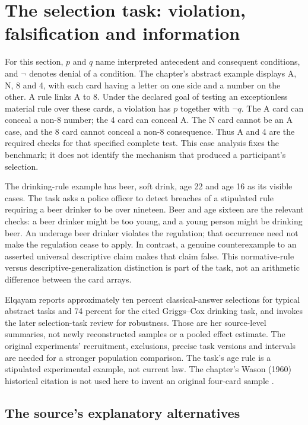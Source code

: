 \section{The selection task: violation, falsification and information}
\label{sec:p19-r112-selection}

For this section, \(p\) and \(q\) name interpreted antecedent and consequent
conditions, and \(\neg\) denotes denial of a condition. The chapter's abstract
example displays A, N, 8 and 4, with each card having a letter on one side and
a number on the other. A rule links A to 8. Under the declared goal of testing
an exceptionless material rule over these cards, a violation has \(p\) together
with \(\neg q\). The A card can conceal a non-8 number; the 4 card can conceal
A. The N card cannot be an A case, and the 8 card cannot conceal a non-8
consequence. Thus A and 4 are the required checks for that specified complete
test. This case analysis fixes the benchmark; it does not identify the
mechanism that produced a participant's selection.

The drinking-rule example has beer, soft drink, age 22 and age 16 as its visible
cases. The task asks a police officer to detect breaches of a stipulated rule
requiring a beer drinker to be over nineteen. Beer and age sixteen are the
relevant checks: a beer drinker might be too young, and a young person might
be drinking beer. An underage beer drinker violates the regulation; that
occurrence need not make the regulation cease to apply. In contrast, a genuine
counterexample to an asserted universal descriptive claim makes that claim
false. This normative-rule versus descriptive-generalization distinction is
part of the task, not an arithmetic difference between the card arrays.

Elqayam reports approximately ten percent classical-answer selections for
typical abstract tasks and 74 percent for the cited Griggs--Cox drinking task,
and invokes the later selection-task review for robustness. Those are her
source-level summaries, not newly reconstructed samples or a pooled effect
estimate. The original experiments' recruitment, exclusions, precise task
versions and intervals are needed for a stronger population comparison.
The task's age rule is a stipulated experimental example, not current law.
The chapter's Wason (1960) historical citation is not used here to invent an
original four-card sample
\cite[p.~652]{Elqayam2021DeonticPsychology}.

\subsection{The source's explanatory alternatives}

